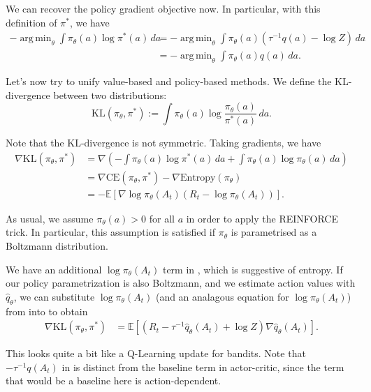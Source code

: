 \documentclass{article}
\DeclareMathOperator*{\argmin}{arg\,min}
\newcommand{\Ex}{\mathbb{E}}
\begin{document}
\noindent We can recover the policy gradient objective now. In particular, with this definition of $\pi^*$, we have
\begin{align*}
  -\argmin_\theta \int \pi_\theta(a) \log \pi^*(a)\, da &= -\argmin_\theta\int \pi_\theta(a)( \tau^{-1} q(a) - \log Z) \, da \\
  &= -\argmin_\theta \int \pi_\theta(a) q(a) \, da.
\end{align*}

\noindent Let's now try to unify value-based and policy-based methods. We define the KL-divergence between two distributions:
\begin{equation}
  \text{KL}(\pi_\theta, \pi^*) := \int \pi_\theta(a) \log\frac{\pi_\theta(a)}{\pi^*(a)}\, da.
\end{equation}

\noindent Note that the KL-divergence is not symmetric. Taking gradients, we have
\begin{align}
  \nabla \text{KL}(\pi_\theta, \pi^*) &= \nabla\left(-  \int  \pi_\theta(a) \log \pi^*(a)\, da + \int \pi_\theta(a) \log \pi_\theta(a)\, da \right) \nonumber \\
&= \nabla\text{CE}(\pi_\theta, \pi^*) -\nabla\text{Entropy}(\pi_\theta) \nonumber \\
&= -\Ex[\nabla \log \pi_\theta(A_t) \left( R_t - \log \pi_\theta(A_t) \right)].
 \label{eq:log-reinforce}
\end{align}


\noindent As usual, we assume $\pi_\theta(a) > 0$ for all $a$ in order to apply the REINFORCE trick. In particular, this assumption is satisfied if $\pi_\theta$ is parametrised as a Boltzmann distribution.

We have an additional $\log \pi_\theta(A_t)$ term in , which is suggestive of entropy. If our policy parametrization is also Boltzmann, and we estimate action values with $\hat{q}_\theta$, we can substitute $\log \pi_\theta(A_t)$ (and an analagous equation for $\log \pi_\theta(A_t)$) from  into  to obtain
\begin{align}
  \nabla \text{KL}(\pi_\theta, \pi^*) &= \Ex[ (R_t - \tau^{-1} \hat{q}_\theta(A_t) + \log Z) \nabla\hat{q}_\theta(A_t)]. \label{eq:qlearning}
\end{align}

\noindent This looks quite a bit like a Q-Learning update for bandits. Note that $- \tau^{-1} q(A_t)$ in  is distinct from the baseline term in actor-critic, since the term that would be a baseline here is action-dependent.
\end{document}
